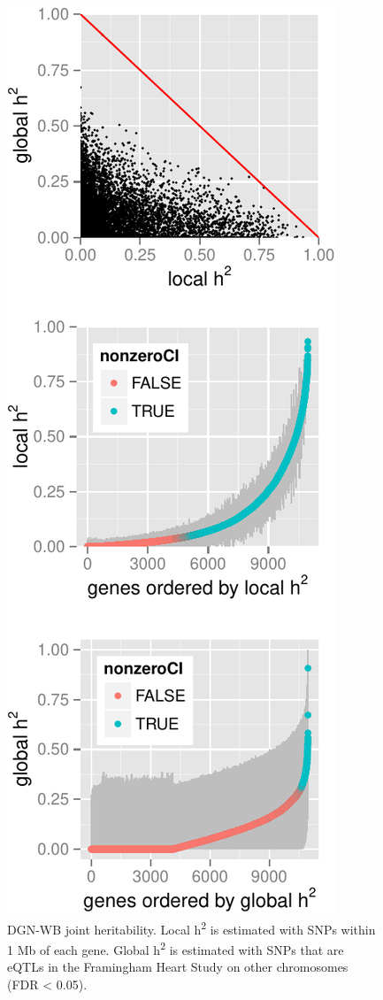 \documentclass[]{article}
\begin{document}
\begin{figure}[htbp]
\centering
\includegraphics{GenArch_manuscript_files/figure-latex/jointH2-1.pdf}
\caption{DGN-WB joint heritability. Local h\textsuperscript{2} is
estimated with SNPs within 1 Mb of each gene. Global
h\textsuperscript{2} is estimated with SNPs that are eQTLs in the
Framingham Heart Study on other chromosomes (FDR \textless{} 0.05).}
\end{figure}
\end{document}
